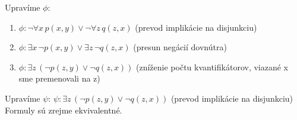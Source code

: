Upravíme $\phi$:
\begin{enumerate}
  \item $\phi : \neg \forall x\, p(x,y) \vee \neg\forall z\, q(z,x)$ (prevod implikácie na disjunkciu)
  \item $\phi : \exists x\, \neg p(x,y) \vee \exists z\, \neg q(z,x)$ (presun negácií dovnútra)
  \item $\phi : \exists z\, (\neg p(z,y) \vee \neg q(z,x))$ (zníženie počtu kvantifikátorov, viazané x sme premenovali na z)
\end{enumerate}
Upravíme $\psi$:
$\psi : \exists z\, (\neg p(z,y) \vee \neg q(z,x))$ (prevod implikácie na disjunkciu)
Formuly sú zrejme ekvivalentné.
